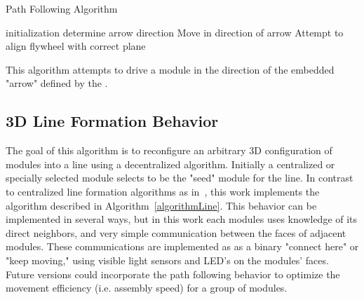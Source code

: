 \setcounter{algorithm}{-1}
\begin{algorithm}
	 
	\caption{Path Following Algorithm}
	\label{algorithmArrow}
	
	\SetAlgoLined
	initialization\;
	{
		determine arrow direction\;
		{
			Move in direction of arrow\;
		}
		{
			Attempt to align flywheel with correct plane\;
		}
	}
	\caption{This algorithm attempts to drive a module in the direction of the embedded "arrow" defined by the \tagNamePlural.}
\end{algorithm}

\subsection{3D Line Formation Behavior}
\label{ssec:algline}


The goal of this algorithm is to reconfigure an arbitrary 3D configuration of modules into a line using a decentralized algorithm. Initially a centralized or specially selected module selects to be the "seed" module for the line.  In contrast to centralized line formation algorithms as in~\cite{sung2015reconfiguration}, this work implements the algorithm described in Algorithm~\ref{algorithmLine}. This behavior can be implemented in several ways, but in this work each modules uses knowledge of its direct neighbors, and very simple communication between the faces of adjacent modules. These communications are implemented as as a binary "connect here" or "keep moving," using visible light sensors and LED's on the modules' faces. Future versions could  incorporate the path following behavior to optimize the movement efficiency (i.e. assembly speed) for a group of modules.

